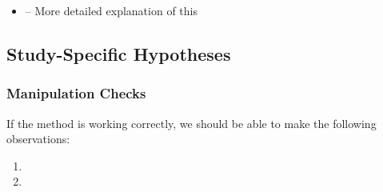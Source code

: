 \begin{itemize}
\item {} -- More detailed explanation of this

\end{itemize}


\subsection{Study-Specific Hypotheses}


\begin{hypothesis}\label{hyp:Exp1:H1ShortName}
\end{hypothesis}




\subsubsection{Manipulation Checks}
If the method is working correctly, we should be able to make the following observations:
\begin{enumerate}[label=\textsc{MC\arabic*}:]
	\item {}
	
	\item {}
\end{enumerate}
